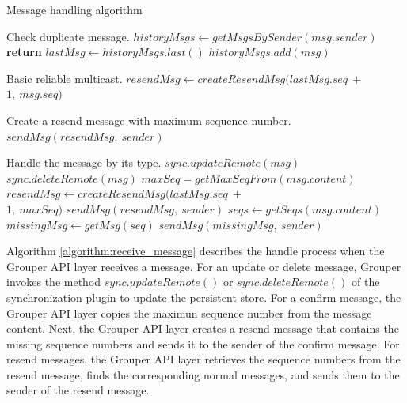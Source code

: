 \documentclass[a4paper,11pt]{report}
\begin{document}
\begin{algorithm}[t]
	\caption{Message handling algorithm}\label{alg:euclid}
	\begin{algorithmic}[1]		
		\LeftComment Check duplicate message.
		\State  $historyMsgs \gets getMsgsBySender(msg.sender)$
		\State \textbf{return}
		\EndIf
		\State $lastMsg \gets historyMsgs.last()$
		\State $historyMsgs.add(msg)$
		
		\LeftComment Basic reliable multicast.
		\State $resendMsg \gets createResendMsg(lastMsg.seq\ +\ $ \\\hspace{2.7cm} $1,\ msg.seq)$
		
		\Comment Create a resend message with maximum sequence number.
		\State $sendMsg(resendMsg,\ sender)$
		\EndIf
		
		\LeftComment Handle the message by its type.
		\State $sync.updateRemote(msg)$
		\State $sync.deleteRemote(msg)$
		\State $maxSeq = getMaxSeqFrom(msg.content)$
		\State $resendMsg \gets createResendMsg(lastMsg.seq\ +\ $ \\\hspace{2.7cm}  $1,\ maxSeq)$
		\State $sendMsg(resendMsg,\ sender)$
		\EndIf
		\State $seqs \gets getSeqs(msg.content)$
		\State $missingMsg \gets getMsg(seq)$
		\State $sendMsg(missingMsg,\ sender)$
		\EndFor
		\EndIf
		\EndProcedure
	\end{algorithmic}
	\label{algorithm:receive_message}
\end{algorithm}

Algorithm \ref{algorithm:receive_message} describes the handle process when the Grouper API layer receives a message.
For an update or delete message, Grouper invokes the method $sync.updateRemote()$ or $sync.deleteRemote()$ of the synchronization plugin to update the persistent store.
For a confirm message, the Grouper API layer copies the maximun sequence number from the message content.
Next, the Grouper API layer creates a resend message that contains the missing sequence numbers and sends it to the sender of the confirm message.
For resend messages, the Grouper API layer retrieves the sequence numbers from the resend message, finds the corresponding normal messages, and sends them to the sender of the resend message.
\end{document}
